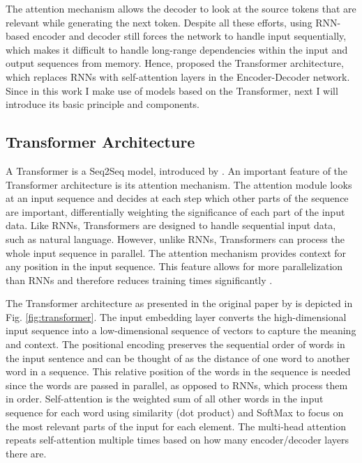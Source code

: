 The attention mechanism allows the decoder to look at the source tokens that are relevant while generating the next token. Despite all these efforts, using RNN-based encoder and decoder still forces the network to handle input sequentially, which makes it difficult to handle long-range dependencies within the input and output sequences from memory. Hence, \cite{transformer} proposed the Transformer architecture, which replaces RNNs with self-attention layers in the Encoder-Decoder network. Since in this work I make use of models based on the Transformer, next I will introduce its basic principle and components.

\subsection{Transformer Architecture}
\label{sec:Background:Transformer}
A Transformer is a Seq2Seq model, introduced by \citet{transformer}. An important feature of the Transformer architecture is its attention mechanism. The attention module looks at an input sequence and decides at each step which other parts of the sequence are important, differentially weighting the significance of each part of the input data. Like RNNs, Transformers are designed to handle sequential input data, such as natural language. However, unlike RNNs, Transformers can process the whole input sequence in parallel. The attention mechanism provides context for any position in the input sequence. This feature allows for more parallelization than RNNs and therefore reduces training times significantly \parencite{transformer}.

The Transformer architecture as presented in the original paper by \citet{transformer} is depicted in Fig. \ref{fig:transformer}.
The input embedding layer converts the high-dimensional input sequence into a low-dimensional sequence of vectors to capture the meaning and context.
The positional encoding preserves the sequential order of words in the input sentence and can be thought of as the distance of one word to another word in a sequence. This relative position of the words in the sequence is needed since the words are passed in parallel, as opposed to RNNs, which process them in order.
Self-attention is the weighted sum of all other words in the input sequence for each word using similarity (dot product) and SoftMax to focus on the most relevant parts of the input for each element. The multi-head attention repeats self-attention multiple times based on how many encoder/decoder layers there are.


